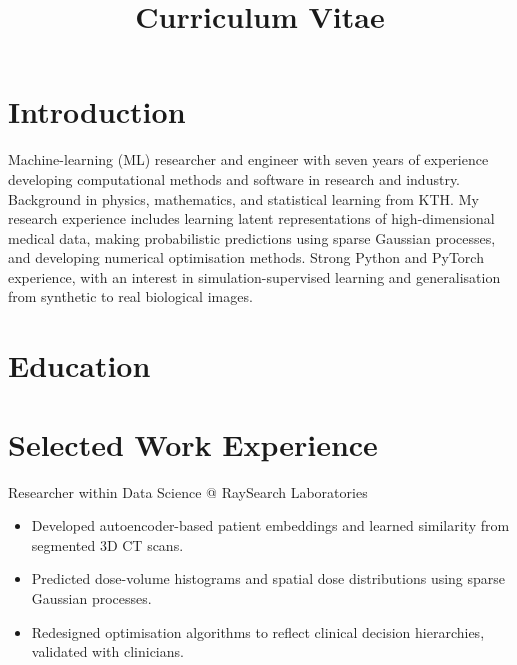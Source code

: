 \documentclass[11pt,a4paper]{moderncv}
\title{Curriculum Vitae}
\begin{document}
\makecvtitle

\section*{Introduction}
Machine-learning (ML) researcher and engineer with seven years of experience developing computational methods and software in research and industry. Background in physics, mathematics, and statistical learning from KTH. My research experience includes learning latent representations of high-dimensional medical data, making probabilistic predictions using sparse Gaussian processes, and developing numerical optimisation methods. Strong Python and PyTorch experience, with an interest in simulation-supervised learning and generalisation from synthetic to real biological images.

\section{Education}




\section{Selected Work Experience}

\large{Researcher within Data Science @ RaySearch Laboratories}
\normalsize
\begin{itemize}
\item Developed autoencoder-based patient embeddings and learned similarity from segmented 3D CT scans.
\item Predicted dose-volume histograms and spatial dose distributions using sparse Gaussian processes.
\item Redesigned optimisation algorithms to reflect clinical decision hierarchies, validated with clinicians.
\end{itemize}
\end{document}
